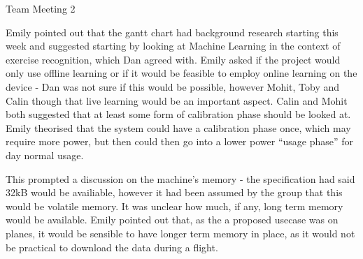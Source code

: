 \documentclass{article}
\begin{document}
\begin{Minutes}{Team Meeting 2}


Emily pointed out that the gantt chart had background research starting this week and suggested starting
by looking at Machine Learning in the context of exercise recognition, which Dan agreed with. Emily asked
if the project would only use offline learning or if it would be feasible to employ online learning on the
device - Dan was not sure if this would be possible, however Mohit, Toby and Calin though that live learning
would be an important aspect. Calin and Mohit both suggested that at least some form of calibration phase
should be looked at. Emily theorised that the system could have a calibration phase once, which may require
more power, but then could then go into a lower power ``usage phase'' for day normal usage.

This prompted a discussion on the machine's memory - the specification had said 32kB would be availiable,
however it had been assumed by the group that this would be volatile memory. It was unclear how much, if
any, long term memory would be available. Emily pointed out that, as the a proposed usecase was on planes,
it would be sensible to have longer term memory in place, as it would not be practical to download the data
during a flight.

\end{Minutes}
\end{document}

